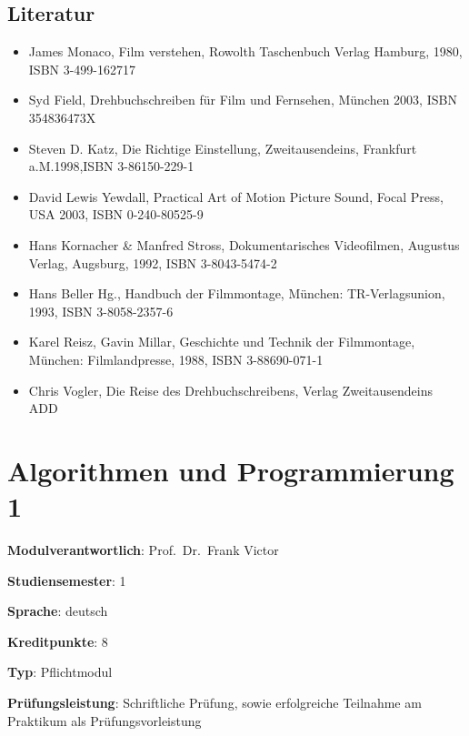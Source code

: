 \hypertarget{literaturpathlabelmi-2017modulbeschreibungen-bachelorba_avm}{%
\section*{Literatur\label{/mi-2017/modulbeschreibungen-bachelor/BA_AVM}}\label{literaturpathlabelmi-2017modulbeschreibungen-bachelorba_avm}}

\begin{itemize}
\tightlist
\item
  James Monaco, Film verstehen, Rowolth Taschenbuch Verlag Hamburg,
  1980, ISBN 3-499-162717
\item
  Syd Field, Drehbuchschreiben für Film und Fernsehen, München 2003,
  ISBN 354836473X
\item
  Steven D. Katz, Die Richtige Einstellung, Zweitausendeins, Frankfurt
  a.M.1998,ISBN 3-86150-229-1
\item
  David Lewis Yewdall, Practical Art of Motion Picture Sound, Focal
  Press, USA 2003, ISBN 0-240-80525-9
\item
  Hans Kornacher \& Manfred Stross, Dokumentarisches Videofilmen,
  Augustus Verlag, Augsburg, 1992, ISBN 3-8043-5474-2
\item
  Hans Beller Hg., Handbuch der Filmmontage, München: TR-Verlagsunion,
  1993, ISBN 3-8058-2357-6
\item
  Karel Reisz, Gavin Millar, Geschichte und Technik der Filmmontage,
  München: Filmlandpresse, 1988, ISBN 3-88690-071-1
\item
  Chris Vogler, Die Reise des Drehbuchschreibens, Verlag Zweitausendeins
  ADD
\end{itemize}

\hypertarget{algorithmen-und-programmierung-1pathlabelmi-2017modulbeschreibungen-bachelorba_algorithmenundprogrammierung1}{%
\chapter{Algorithmen und Programmierung
1\label{/mi-2017/modulbeschreibungen-bachelor/BA_AlgorithmenundProgrammierung1}}\label{algorithmen-und-programmierung-1pathlabelmi-2017modulbeschreibungen-bachelorba_algorithmenundprogrammierung1}}

\begin{modulHead}
\textbf{Modulverantwortlich}: Prof.~Dr.~Frank
Victor
\end{modulHead}
\begin{modulHead}
\textbf{Studiensemester}:
1
\end{modulHead}
\begin{modulHead}
\textbf{Sprache}:
deutsch
\end{modulHead}
\begin{modulHead}
\textbf{Kreditpunkte}:
8
\end{modulHead}
\begin{modulHead}
\textbf{Typ}:
Pflichtmodul
\end{modulHead}
\begin{modulHead}
\textbf{Prüfungsleistung}:
Schriftliche Prüfung, sowie erfolgreiche Teilnahme am Praktikum als
Prüfungsvorleistung
\end{modulHead}


